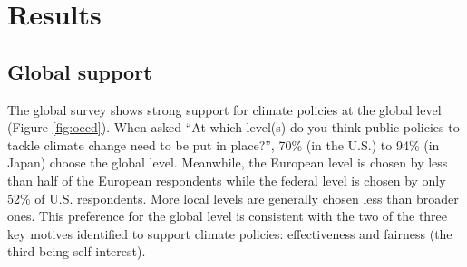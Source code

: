 \documentclass{nature}
\makeatletter
\renewenvironment*{figure}{\@float{figure}}{\end@float}
\makeatother
\begin{document}
\section{Results}
\subsection{Global support}
The global survey shows strong support for climate policies at the global level (Figure \ref{fig:oecd}). When asked ``At which level(s) do you think public policies to tackle climate change need to be put in place?'', 70\% (in the U.S.) to 94\% (in Japan) choose the global level. Meanwhile, the European level is chosen by less than half of the European respondents while the federal level is chosen by only 52\% of U.S. respondents. More local levels are generally chosen less than broader ones. This preference for the global level is consistent with the two of the three key motives identified to support climate policies:\cite{klenert_making_2018,douenne_yellow_2022,dechezlepretre_fighting_2022} effectiveness and fairness (the third being self-interest). 

\begin{figure}
  \caption{Share of support (somewhat or strongly) for the main global policies among non-\textit{indifferent} ($n$ = 40,680).} %
  \label{fig:oecd}
\end{figure}
\end{document}

